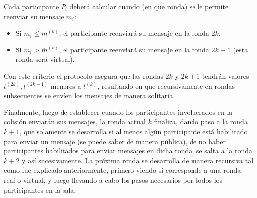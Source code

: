 Cada participante $P_i$ deberá calcular cuando (en que ronda) se le permite reenviar su mensaje $m_i$:
\begin{itemize}
    \item Si $m_i \leq \overline{m}^{(k)}$, el participante reenviará su mensaje en la ronda $2k$.
    \item Si $m_i > \overline{m}^{(k)}$, el participante reenviará su mensaje en la ronda $2k + 1$ 
    (esta ronda será virtual).
\end{itemize}

Con este criterio el protocolo asegura que las rondas $2k$ y $2k + 1$ tendrán valores 
$t^{(2k)}, t^{(2k + 1)}$ menores a $t^{(k)}$, resultando en que recursivamente en rondas 
subsecuentes se envíen los mensajes de manera solitaria.

Finalmente, luego de establecer cuando los participantes involucrados en la colisión enviarán 
sus mensajes, la ronda actual $k$ finaliza, dando paso a la ronda $k+1$, que solamente se 
desarrolla si al menos algún participante está habilitado para enviar un mensaje (se puede 
saber de manera pública), de no haber participantes habilitados para enviar mensajes en dicha 
ronda, se salta a la ronda $k+2$ y así sucesivamente. La próxima ronda se desarrolla de manera 
recursiva tal como fue explicado anteriormente, primero viendo si corresponde a una ronda real 
o virtual, y luego llevando a cabo los pasos necesarios por todos los participantes en la sala.